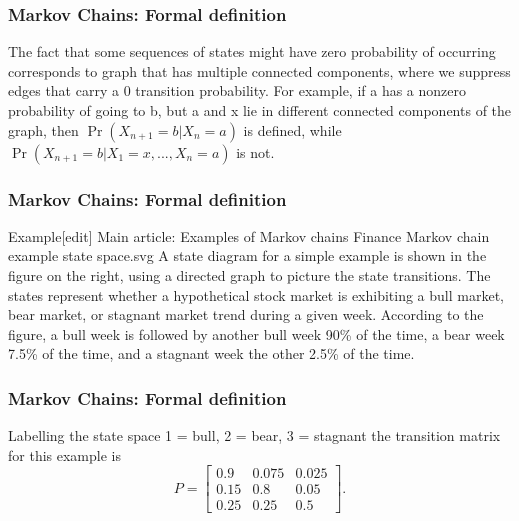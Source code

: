 \begin{frame}
	\frametitle{Markov Chains: Formal definition}
The fact that some sequences of states might have zero probability of occurring corresponds to graph that has multiple connected components, where we suppress edges that carry a 0 transition probability. For example, if a has a nonzero probability of going to b, but a and x lie in different connected components of the graph, then $\Pr(X_{n+1}=b|X_n=a)$ is defined, while $\Pr(X_{n+1}=b|X_1=x, ...,  X_n=a)$ is not.

\end{frame}
\begin{frame}
	\frametitle{Markov Chains: Formal definition}
Example[edit]
Main article: Examples of Markov chains
Finance Markov chain example state space.svg
A state diagram for a simple example is shown in the figure on the right, using a directed graph to picture the state transitions. The states represent whether a hypothetical stock market is exhibiting a bull market, bear market, or stagnant market trend during a given week. According to the figure, a bull week is followed by another bull week 90\% of the time, a bear week 7.5\% of the time, and a stagnant week the other 2.5\% of the time. 
\end{frame}
\begin{frame}
	\frametitle{Markov Chains: Formal definition}
Labelling the state space {1 = bull, 2 = bear, 3 = stagnant} the transition matrix for this example is
\[P = \begin{bmatrix}
	0.9 & 0.075 & 0.025 \\
	0.15 & 0.8 & 0.05 \\
	0.25 & 0.25 & 0.5
\end{bmatrix}.\]
\end{frame}
